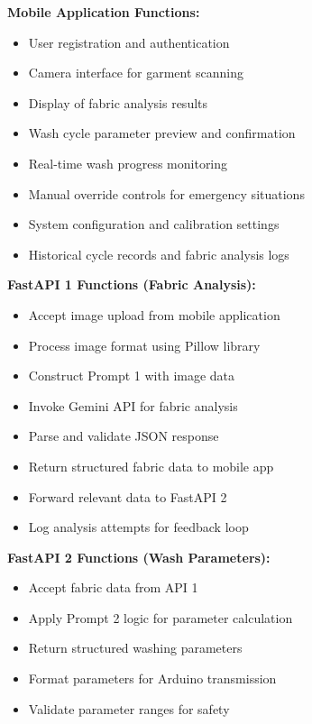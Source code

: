 \textbf{Mobile Application Functions:}
\begin{itemize}
    \item User registration and authentication
    \item Camera interface for garment scanning
    \item Display of fabric analysis results
    \item Wash cycle parameter preview and confirmation
    \item Real-time wash progress monitoring
    \item Manual override controls for emergency situations
    \item System configuration and calibration settings
    \item Historical cycle records and fabric analysis logs
\end{itemize}

\textbf{FastAPI 1 Functions (Fabric Analysis):}
\begin{itemize}
    \item Accept image upload from mobile application
    \item Process image format using Pillow library
    \item Construct Prompt 1 with image data
    \item Invoke Gemini API for fabric analysis
    \item Parse and validate JSON response
    \item Return structured fabric data to mobile app
    \item Forward relevant data to FastAPI 2
    \item Log analysis attempts for feedback loop
\end{itemize}

\textbf{FastAPI 2 Functions (Wash Parameters):}
\begin{itemize}
    \item Accept fabric data from API 1
    \item Apply Prompt 2 logic for parameter calculation
    \item Return structured washing parameters
    \item Format parameters for Arduino transmission
    \item Validate parameter ranges for safety
\end{itemize}

